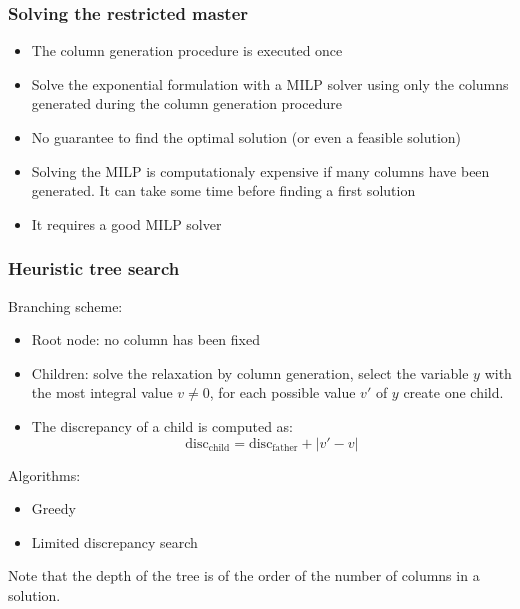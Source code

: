 \documentclass[10pt]{beamer}
\begin{document}
\begin{frame}
  \frametitle{Solving the restricted master}

  \begin{itemize}
    \item The column generation procedure is executed once
    \item Solve the exponential formulation with a MILP solver using only the columns generated during the column generation procedure
    \item No guarantee to find the optimal solution (or even a feasible solution)
    \item Solving the MILP is computationaly expensive if many columns have been generated. It can take some time before finding a first solution
    \item It requires a good MILP solver 
  \end{itemize}
\end{frame}

\begin{frame}
  \frametitle{Heuristic tree search}

  Branching scheme:
  \begin{itemize}
    \item Root node: no column has been fixed
    \item Children: solve the relaxation by column generation, select the variable $y$ with the most integral value $v \neq 0$, for each possible value $v'$ of $y$ create one child.
    \item The discrepancy of a child is computed as:
      \begin{displaymath}
        \mathrm{disc}_\text{child} = \mathrm{disc}_\text{father} + | v' - v |
      \end{displaymath}
  \end{itemize}

  Algorithms:
  \begin{itemize}
    \item Greedy
    \item Limited discrepancy search
  \end{itemize}

  Note that the depth of the tree is of the order of the number of columns in a solution.
\end{frame}
\end{document}
